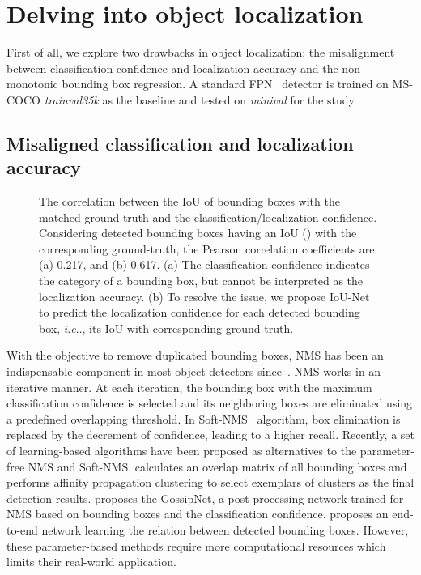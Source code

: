 \documentclass[runningheads]{llncs}
\makeatletter
\DeclareRobustCommand\onedot{\futurelet\@let@token\@onedot}
\def\@onedot{\ifx\@let@token.\else.\null\fi\xspace}
\def\ie{\emph{i.e}\onedot} \def\Ie{\emph{I.e}\onedot}
\makeatother
\begin{document}
 \section{Delving into object localization}
\label{sec:delving}

First of all, we explore two drawbacks in object localization: the misalignment between classification confidence and localization accuracy and the non-monotonic bounding box regression. A standard FPN~\cite{Lin_2017_CVPR} detector is trained on MS-COCO \emph{trainval35k} as the baseline and tested on \emph{minival} for the study.

\subsection{Misaligned classification and localization accuracy}
\label{sec:problem:nms}
\begin{figure}[t]
\centering
{}
\caption{
The correlation between the IoU of bounding boxes with the matched ground-truth and the classification/localization confidence. Considering detected bounding boxes having an IoU () with the corresponding ground-truth, the Pearson correlation coefficients are: (a) 0.217, and (b) 0.617.\newline
(a) The classification confidence indicates the category of a bounding box, but cannot be interpreted as the localization accuracy.\newline
(b) To resolve the issue, we propose IoU-Net to predict the localization confidence for each detected bounding box, \ie, its IoU with corresponding ground-truth.
}
\label{fig:distribution}
\end{figure}

With the objective to remove duplicated bounding boxes, NMS has been an indispensable component in most object detectors since~\cite{dalal2005histograms}. NMS works in an iterative manner. At each iteration, the bounding box with the maximum classification confidence is selected and its neighboring boxes are eliminated using a predefined overlapping threshold. In Soft-NMS~\cite{bodla2017improving} algorithm, box elimination is replaced by the decrement of confidence, leading to a higher recall. Recently, a set of learning-based algorithms have been proposed as alternatives to the parameter-free NMS and Soft-NMS. \cite{rothe2014non} calculates an overlap matrix of all bounding boxes and performs affinity propagation clustering to select exemplars of clusters as the final detection results. \cite{hosang2017learning} proposes the GossipNet, a post-processing network trained for NMS based on bounding boxes and the classification confidence. \cite{hu2017relation} proposes an end-to-end network learning the relation between detected bounding boxes. However, these parameter-based methods require more computational resources which limits their real-world application.
\end{document}
